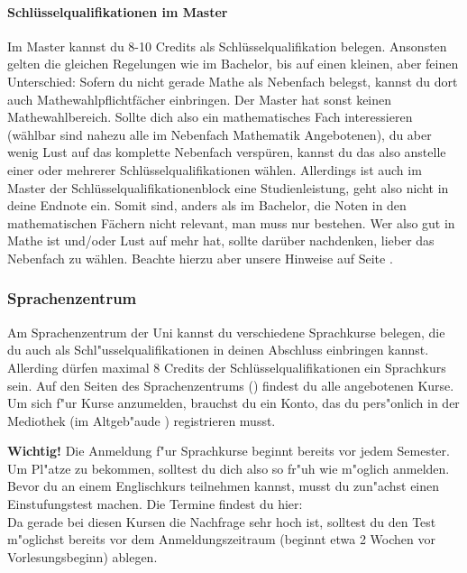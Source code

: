 \paragraph*{Schlüsselqualifikationen im Master}
Im Master kannst du 8-10 Credits als Schlüsselqualifikation
belegen. Ansonsten gelten die gleichen Regelungen wie im Bachelor, bis
auf einen kleinen, aber feinen Unterschied: Sofern du nicht gerade
Mathe als Nebenfach belegst, kannst du dort auch
Mathewahlpflichtfächer einbringen. Der Master hat sonst keinen
Mathewahlbereich. Sollte dich also ein mathematisches Fach
interessieren (wählbar sind nahezu alle im Nebenfach Mathematik Angebotenen), du
aber wenig Lust auf das komplette Nebenfach verspüren, kannst du das
also anstelle einer oder mehrerer Schlüsselqualifikationen
wählen. Allerdings ist auch im Master der
Schlüsselqualifikationenblock eine Studienleistung, geht also nicht in
deine Endnote ein. Somit sind, anders als im Bachelor, die Noten in
den mathematischen Fächern nicht relevant, man muss nur bestehen. Wer
also gut in Mathe ist und/oder Lust auf mehr hat, sollte darüber
nachdenken, lieber das Nebenfach zu wählen. Beachte hierzu aber unsere
Hinweise auf Seite \pageref{nebenfach}.
%
\subsubsection*{Sprachenzentrum}
Am Sprachenzentrum der Uni kannst du verschiedene Sprachkurse belegen,
die du auch als Schl"usselqualifikationen in deinen Abschluss
einbringen kannst. Allerding dürfen maximal 8 Credits der
Schlüsselqualifikationen ein Sprachkurs sein.
Auf den Seiten des Sprachenzentrums () findest du alle angebotenen Kurse.
Um sich f"ur Kurse anzumelden, brauchst du ein Konto, das du pers"onlich in der Mediothek (im Altgeb"aude ) registrieren musst.

\textbf{Wichtig!} Die Anmeldung f"ur Sprachkurse beginnt bereits vor jedem Semester.
Um Pl"atze zu bekommen, solltest du dich also so fr"uh wie m"oglich anmelden.
Bevor du an einem Englischkurs teilnehmen kannst, musst du zun"achst einen Einstufungstest machen.
Die Termine findest du hier: \\
Da gerade bei diesen Kursen die Nachfrage sehr hoch ist, solltest du den Test m"oglichst bereits vor dem Anmeldungszeitraum (beginnt etwa 2 Wochen vor Vorlesungsbeginn) ablegen.

